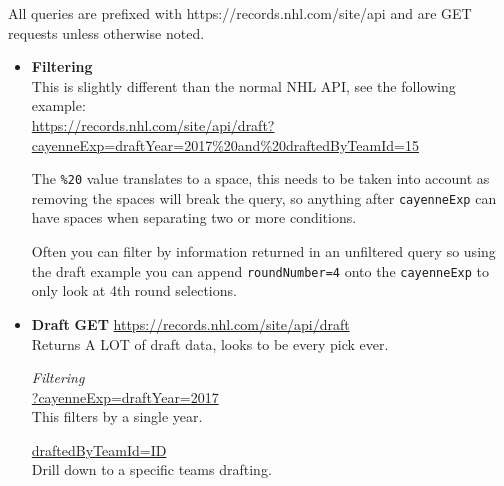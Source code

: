 \documentclass[11pt]{article}
\begin{document}
    All queries are prefixed with https://records.nhl.com/site/api and are GET requests unless otherwise noted.

    \begin{itemize}
        \item \textbf{Filtering} \\

        This is slightly different than the normal NHL API, see the following example: \\
        \url{https://records.nhl.com/site/api/draft?cayenneExp=draftYear=2017\%20and\%20draftedByTeamId=15}

        The \texttt{\%20} value translates to a space, this needs to be taken into account as removing the spaces will break the query, so anything after \texttt{cayenneExp} can have spaces when separating two or more conditions.

        Often you can filter by information returned in an unfiltered query so using the draft example you can append \texttt{roundNumber=4} onto the \texttt{cayenneExp} to only look at 4th round selections.

        \item \textbf{Draft}
        \textbf{GET} \url{https://records.nhl.com/site/api/draft} \\
        Returns A LOT of draft data, looks to be every pick ever.

        \textit{Filtering} \\
        \url{?cayenneExp=draftYear=2017} \\
        This filters by a single year.

        \url{draftedByTeamId=ID} \\
        Drill down to a specific teams drafting.

    \end{itemize}
\end{document}
